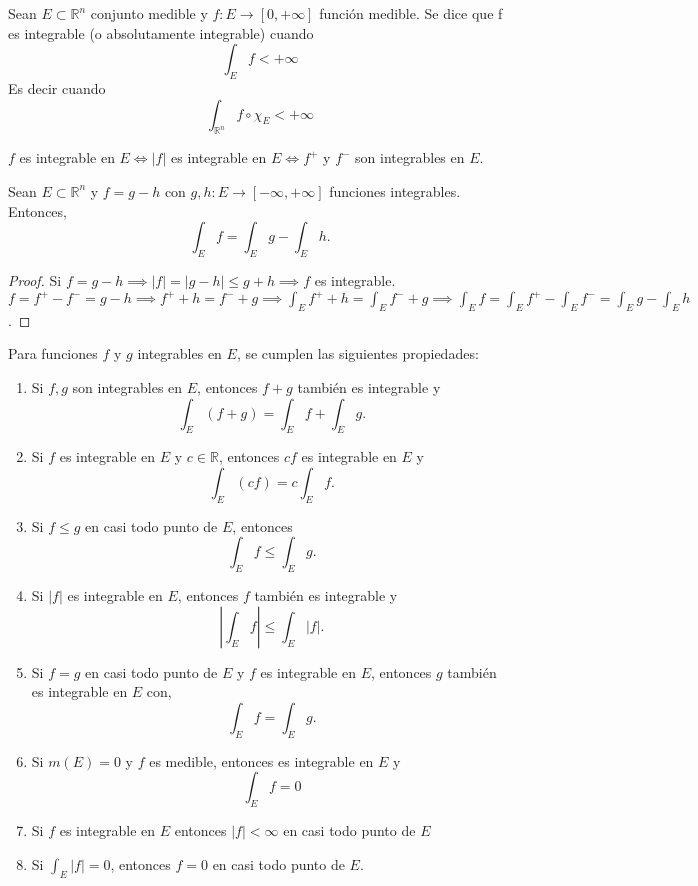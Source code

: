 \begin{definición}
    Sean $E \subset \mathbb{R}^n$ conjunto medible y $f: E \to [0, +\infty]$ función medible. Se dice que f es integrable (o absolutamente integrable) cuando $$\int_{E}f < +\infty$$ Es decir cuando $$\int_{\mathbb{R}^n}f\circ\chi_E < +\infty$$
\end{definición}
\begin{observación}
    $f$ es integrable en $E \iff |f|$ es integrable en $E \iff f^+ $ y $ f^-$ son integrables en $E$.
\end{observación}
\begin{lema}
    Sean $E \subset \mathbb{R}^n$ y $f = g - h$ con $g, h: E \to [-\infty, +\infty]$ funciones integrables. Entonces, $$ \int_{E}f = \int_{E}g - \int_{E}h.$$
\end{lema}
\begin{proof}
    Si $ f = g - h \implies  |f| = |g - h| \leq g + h \implies f$ es integrable.
    $f = f^+ - f^- = g - h \implies f^+ + h = f^- + g \implies \int_{E}f^+ + h = \int_{E}f^- + g \implies \int_{E}f = \int_{E}f^+ - \int_{E}f^- = \int_{E}g - \int_{E}h$. 
\end{proof}
\begin{proposición}
    Para funciones $f$ y $g$ integrables en $E$, se cumplen las siguientes propiedades:

\begin{enumerate}
    \item Si $f, g$ son integrables en $E$, entonces $f+g$ también es integrable y $$ \int_E (f+g) = \int_E f + \int_E g. $$

    \item Si $f$ es integrable en $E$ y $c \in \mathbb{R}$, entonces $cf$ es integrable en $E$ y $$ \int_E (cf) = c \int_E f. $$

    \item Si $f \leq g$ en casi todo punto de $E$, entonces $$ \int_E f \leq \int_E g. $$

    \item Si $|f|$ es integrable en $E$, entonces $f$ también es integrable y $$ \left| \int_E f \right| \leq \int_E |f|. $$

    \item Si $f = g$ en casi todo punto de $E$ y $f$ es integrable en $E$, entonces $g$ también es integrable en $E$ con, $$ \int_E f = \int_E g. $$

    \item Si $m(E) = 0$ y $f$ es medible, entonces es integrable en $E$ y $$ \int_E f = 0 $$

    \item Si $f$ es integrable en $E$ entonces $|f| < \infty$ en casi todo punto de $E$

    \item Si $\int_E |f| = 0$, entonces $f = 0$ en casi todo punto de $E$.
\end{enumerate}
\end{proposición}
